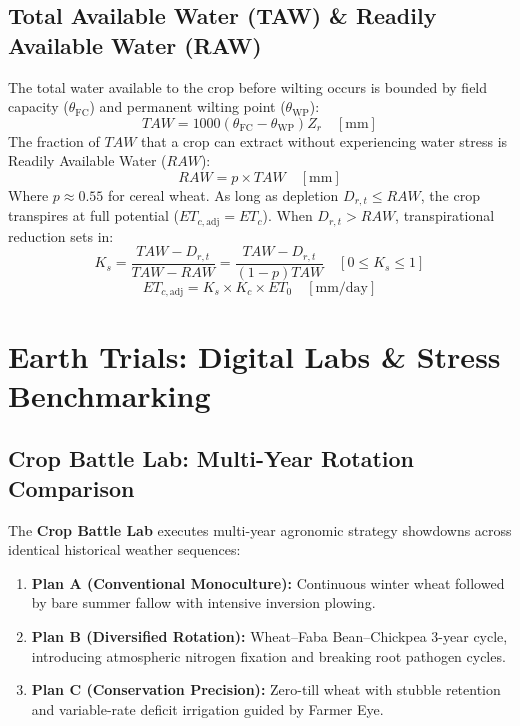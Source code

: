 \documentclass[11pt,a4paper,oneside]{report}
\begin{document}
\section{Total Available Water (TAW) \& Readily Available Water (RAW)}
The total water available to the crop before wilting occurs is bounded by field capacity ($\theta_{\text{FC}}$) and permanent wilting point ($\theta_{\text{WP}}$):
\begin{equation}
TAW = 1000 (\theta_{\text{FC}} - \theta_{\text{WP}}) Z_r \quad [\text{mm}]
\end{equation}
The fraction of $TAW$ that a crop can extract without experiencing water stress is Readily Available Water ($RAW$):
\begin{equation}
RAW = p \times TAW \quad [\text{mm}]
\end{equation}
Where $p \approx 0.55$ for cereal wheat. As long as depletion $D_{r,t} \le RAW$, the crop transpires at full potential ($ET_{c,\text{adj}} = ET_c$). When $D_{r,t} > RAW$, transpirational reduction sets in:
\begin{equation}
K_s = \frac{TAW - D_{r,t}}{TAW - RAW} = \frac{TAW - D_{r,t}}{(1 - p) TAW} \quad [0 \le K_s \le 1]
\end{equation}
\begin{equation}
ET_{c,\text{adj}} = K_s \times K_c \times ET_0 \quad [\text{mm/day}]
\end{equation}

\chapter{Earth Trials: Digital Labs \& Stress Benchmarking}

\section{Crop Battle Lab: Multi-Year Rotation Comparison}
The \textbf{Crop Battle Lab} executes multi-year agronomic strategy showdowns across identical historical weather sequences:
\begin{enumerate}
    \item \textbf{Plan A (Conventional Monoculture):} Continuous winter wheat followed by bare summer fallow with intensive inversion plowing.
    \item \textbf{Plan B (Diversified Rotation):} Wheat–Faba Bean–Chickpea 3-year cycle, introducing atmospheric nitrogen fixation and breaking root pathogen cycles.
    \item \textbf{Plan C (Conservation Precision):} Zero-till wheat with stubble retention and variable-rate deficit irrigation guided by Farmer Eye.
\end{enumerate}
\end{document}
